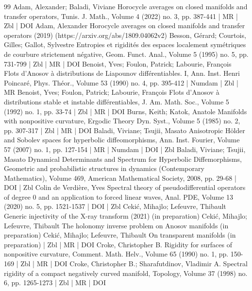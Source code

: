 \begin{thebibliography}{99}
Adam, Alexander; Baladi, Viviane Horocycle averages on closed manifolds and transfer operators, Tunis. J. Math., Volume 4 (2022) no. 3, pp. 387-441 | MR | Zbl | DOI
Adam, Alexander Horocycle averages on closed manifolds and transfer operators (2019) (https://arxiv.org/abs/1809.04062v2)
Besson, Gérard; Courtois, Gilles; Gallot, Sylvestre Entropies et rigidités des espaces localement symétriques de courbure strictement négative, Geom. Funct. Anal., Volume 5 (1995) no. 5, pp. 731-799 | Zbl | MR | DOI
Benoist, Yves; Foulon, Patrick; Labourie, François Flots d’Anosov à distributions de Liapounov différentiables. I, Ann. Inst. Henri Poincaré, Phys. Théor., Volume 53 (1990) no. 4, pp. 395-412 | Numdam | Zbl | MR
Benoist, Yves; Foulon, Patrick; Labourie, François Flots d’Anosov à distributions stable et instable différentiables, J. Am. Math. Soc., Volume 5 (1992) no. 1, pp. 33-74 | Zbl | MR | DOI
Burns, Keith; Katok, Anatole Manifolds with nonpositive curvature, Ergodic Theory Dyn. Syst., Volume 5 (1985) no. 2, pp. 307-317 | Zbl | MR | DOI
Baladi, Viviane; Tsujii, Masato Anisotropic Hölder and Sobolev spaces for hyperbolic diffeomorphisms, Ann. Inst. Fourier, Volume 57 (2007) no. 1, pp. 127-154 | MR | Numdam | DOI | Zbl
Baladi, Viviane; Tsujii, Masato Dynamical Determinants and Spectrum for Hyperbolic Diffemorphisms, Geometric and probabilistic structures in dynamics (Contemporary Mathematics), Volume 469, American Mathematical Society, 2008, pp. 29-68 | DOI | Zbl
Colin de Verdière, Yves Spectral theory of pseudodifferential operators of degree 0 and an application to forced linear waves, Anal. PDE, Volume 13 (2020) no. 5, pp. 1521-1537 | DOI | Zbl
Cekić, Mihajlo; Lefeuvre, Thibault Generic injectivity of the X-ray transform (2021) (in preparation)
Cekić, Mihajlo; Lefeuvre, Thibault The holonomy inverse problem on Anosov manifolds (in preparation)
Cekić, Mihajlo; Lefeuvre, Thibault On transparent manifolds (in preparation) | Zbl | MR | DOI
Croke, Christopher B. Rigidity for surfaces of nonpositive curvature, Comment. Math. Helv., Volume 65 (1990) no. 1, pp. 150-169 | Zbl | MR | DOI
Croke, Christopher B.; Sharafutdinov, Vladimir A. Spectral rigidity of a compact negatively curved manifold, Topology, Volume 37 (1998) no. 6, pp. 1265-1273 | Zbl | MR | DOI

\end{thebibliography}
